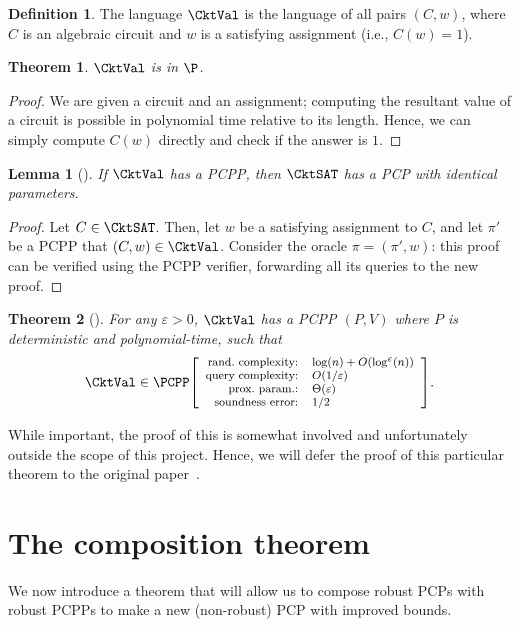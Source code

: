 \documentclass[english,12pt]{reedthesis}
\theoremstyle{plain}
\newtheorem{thm}{Theorem}[section]
\newtheorem{lemma}[lemma]{Lemma}
\theoremstyle{definition}
\newtheorem{defn}[defn]{Definition}
\theoremstyle{remark}
\newcommand{\pcpp}[4]{%
  \ensuremath%
  \mleft[{\footnotesize\begin{array}{r l}
    \text{rand.\ complexity:} & #1 \\
    \text{query complexity:} & #2 \\
    \text{prox.\ param.:} & #3 \\
    \text{soundness error:} & #4
  \end{array}}\mright]%
}
\begin{document}
\begin{defn}\label{def:cktval}
  The language $\CktVal$ is the language of all pairs $(C, w)$, where $C$ is an
  algebraic circuit and $w$ is a satisfying assignment (i.e., $C(w) = 1$).
\end{defn}

\begin{thm}\label{thm:cktval-in-p}
  $\CktVal$ is in $\P$.
\end{thm}

\begin{proof}
  We are given a circuit and an assignment; computing the resultant value of a
  circuit is possible in polynomial time relative to its length. Hence, we can
  simply compute $C(w)$ directly and check if the answer is $1$.
\end{proof}

\begin{lemma}[{\cite[Prop.\ 2.4]{BGHSV06}}]\label{thm:cktval-cktsat}
  If $\CktVal$ has a PCPP, then $\CktSAT$ has a PCP with identical parameters.
\end{lemma}

\begin{proof}
  Let $C \in \CktSAT$. Then, let $w$ be a satisfying assignment to $C$, and let
  $\pi'$ be a PCPP that $(C, w) \in \CktVal$. Consider the oracle $\pi = (\pi', w)$:
  this proof can be verified using the PCPP verifier, forwarding all its queries
  to the new proof.
\end{proof}

\begin{thm}[{\cite[Theorem 3.3]{BGHSV06}}]\label{thm:ckt-val-pcpp}
  For any $\varepsilon > 0$, $\CktVal$ has a PCPP $(P, V)$ where $P$ is deterministic and
  polynomial-time, such that
  \[
    \CktVal \in \PCPP\pcpp{\log(n) + O(\log^{\varepsilon}(n))}{O(1/\varepsilon)}{\Theta(\varepsilon)}{1/2}.
  \]
\end{thm}

While important, the proof of this is somewhat involved and unfortunately
outside the scope of this project. Hence, we will defer the proof of this
particular theorem to the original paper~\cite{BGHSV06}.

\section{The composition theorem}\label{sec:comp-theorem}

We now introduce a theorem that will allow us to compose robust PCPs with robust
PCPPs to make a new (non-robust) PCP with improved bounds.
\end{document}

